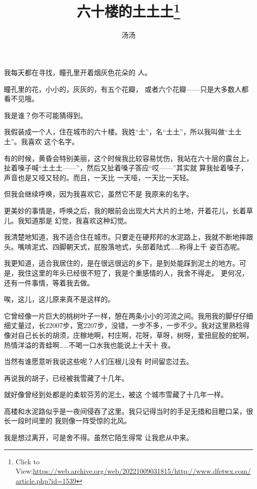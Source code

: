 \documentclass{article}
\title{六十楼的土土土\footnote{Click to View:\url{https://web.archive.org/web/20221009031815/http://www.dfetwx.com/article.php?id=1539}}}
\author{汤汤}
\date{}
\begin{document}

\maketitle


\Large

﻿我每天都在寻找，瞳孔里开着烟灰色花朵的
人。 

瞳孔里的花，小小的，灰灰的，有五个花瓣，
或者六个花瓣——只是大多数人都看不见哦。 


我是谁？你不可能猜得到。 

我假装成一个人，住在城市的六十楼。我姓“土”，名“土土”，所以我叫做“土土土”。我喜欢
这个名字。 

有的时候，黄昏会特别美丽，这个时候我比较容易忧伤，我站在六十层的露台上，扯着嗓子喊“土土土——”，然后又扯着嗓子答应“哎——”其实就
\newpage
算我扯着嗓子，声音也是又哑又轻的。而且，一天比
一天哑，一天比一天轻。 

但我会继续呼唤，因为我喜欢它，虽然它不是
我原来的名字。 

更美妙的事情是，呼唤之后，我的眼前会出现大片大片的土地，开着花儿，长着草儿。我知道那是
幻觉，我喜欢这种幻觉。 

我清楚地知道，我不适合住在城市。只要走在硬邦邦的水泥路上，我就不断地摔跟头。嘴啃泥式、四脚朝天式，屁股落地式，头部着陆式……称得上千
姿百态呢。 

我更知道，适合我居住的，是在很远很远的乡下，是到处能踩到泥土的地方。可是，我住这里的年头已经很不短了，我是个重感情的人，我舍不得走。
更何况，还有一件事情，等着我去做。 


\newpage

唉，这儿，这儿原来真不是这样的。 

它曾经像一片巨大的桃树叶子一样，憩在两条小小的河流之间。我用我的脚仔仔细细丈量过，长22007步，宽2207步，没错，一步不多，一步不少。我对这里熟稔得像对自己长长的胡须，庄稼地啊，村庄啊，花呀，草呀，树呀，爱扭屁股的蛇啊，热情洋溢的青蛙啊……不喝一口水我也能说上十天十
夜。 

当然有谁愿意听我说这些呢？人们压根儿没有
时间留恋过去。 


再说我的胡子，已经被我雪藏了十几年。 

就好像曾经到处都是的柔软芬芳的泥土，被这
个城市雪藏了十几年一样。 

高楼和水泥路似乎是一夜间侵吞了这里。我只记得当时的手足无措和目瞪口呆，很长一段时间里的
我则像一阵受惊的北风。 

\newpage

我是想过离开，可是舍不得。虽然它陌生得常
让我悲从中来。 
\end{document}
